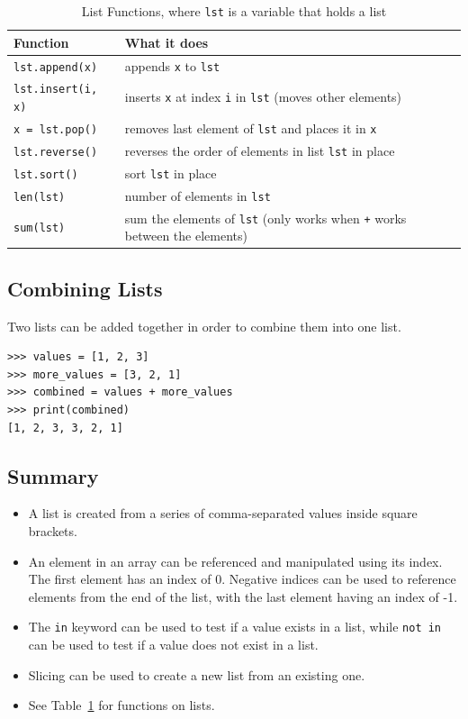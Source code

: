 \documentclass[11pt]{cselabheader}
\begin{document}
\begin{table}[!ht]
  \centering
  \begin{tabular}{ll}
    \toprule
    Function & What it does \\
    \midrule
    \lstinline!lst.append(x)! & appends \lstinline!x! to \lstinline!lst! \\
    \lstinline!lst.insert(i, x)! & inserts \lstinline!x! at index \lstinline!i!
    in \lstinline!lst! (moves other elements) \\
    \lstinline!x = lst.pop()! & removes last element of \lstinline!lst! and
    places it in \lstinline!x! \\
    \lstinline!lst.reverse()! & reverses the order of elements in list
    \lstinline!lst! in place\\
    \lstinline!lst.sort()! & sort \lstinline!lst! in place \\
    \lstinline!len(lst)! & number of elements in \lstinline!lst! \\
    \lstinline!sum(lst)! & sum the elements of \lstinline!lst! (only works when
    \lstinline!+! works between the elements)\\
    \bottomrule
  \end{tabular}
  \caption{List Functions, where \lstinline!lst! is a variable that holds a list}
  \label{tab:lists}
\end{table}

\subsection{Combining Lists}
Two lists can be added together in order to combine them into one list.

\begin{lstlisting}[style=ipython]
>>> values = [1, 2, 3]
>>> more_values = [3, 2, 1]
>>> combined = values + more_values
>>> print(combined)
[1, 2, 3, 3, 2, 1]
\end{lstlisting}

\subsection{Summary}

\begin{itemize}
  \item A list is created from a series of comma-separated values inside square
    brackets.  
  \item An element in an array can be referenced and manipulated
    using its index. The first element has an index of 0. Negative indices can
    be used to reference elements from the end of the list, with the last
    element having an index of -1.
  \item The \lstinline{in} keyword can be used to test if a value exists in a
    list, while \lstinline!not in! can be used to test if a value does not exist
    in a list.
  \item Slicing can be used to create a new list from an existing one.
  \item See Table~\ref{tab:lists} for functions on lists.
\end{itemize}
\end{document}
